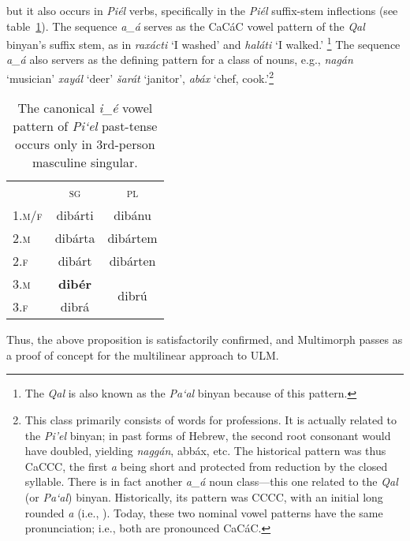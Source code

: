  but it also occurs in \textit{Pi\'{e}l} verbs, specifically in the \textit{Pi\'{e}l} suffix-stem inflections (see table~\ref{tab:piel-paradigm}).
The sequence \textit{a\_\'{a}} serves as the CaC\'{a}C vowel pattern of the \textit{Qal} 
binyan's suffix stem, as in \textit{rax\'{a}cti} `I washed' and \textit{hal\'{a}ti} `I walked.'
\footnote{The \textit{Qal} is also known as the \textit{\textit{Pa`al}} binyan because
of this pattern.}
The sequence \textit{a\_\'{a}} also servers as the defining pattern for a class of nouns, e.g., \textit{nag\'{an}} `musician'  \textit{xay\'{a}l} `deer' \textit{\v{s}ar\'{a}t} `janitor', \textit{ab\'{a}x} `chef, cook.'\footnote{This class primarily consists of words for professions. It is actually related to the \textit{Pi'el} binyan; in past forms of Hebrew, the second root consonant would have doubled, yielding \textit{nagg\'{an}}, abb\'{a}x, etc. The historical pattern was thus CaCCC, the first \textit{a} being short and protected from reduction by the closed syllable.   There is in fact another \textit{a\_\'{a}} noun class---this one related to the \textit{Qal} (or \textit{Pa`al}) binyan. Historically, its pattern was CCCC, with an initial long rounded \textit{a} (i.e., ). Today, these two nominal vowel patterns have the same pronunciation; i.e., both are pronounced CaC\'{a}C.}

\begin{table}[t]
\centering
\setlength{\extrarowheight}{6pt}
\begin{tabular}{lcc}
\toprule
& \textsc{sg} & \textsc{pl} \\
\cmidrule{2-3}
\textsc{1.m/f} & dib\'{a}rti &  dib\'{a}nu \\
\textsc{2.m} & dib\'{a}rta & dib\'{a}rtem \\
\textsc{2.f} & dib\'{a}rt & dib\'{a}rten \\
\textsc{3.m} & \textbf{dib\'{e}r} & \multirow{2}{*}{dibr\'{u}} \\
\textsc{3.f} &  dibr\'{a} &  \\
 \bottomrule
\end{tabular}
\label{tab:piel-paradigm}
\caption{The canonical \textit{i\_\'e} vowel pattern of \textit{Pi`el} past-tense occurs only in 3rd-person masculine singular.}
\end{table}

Thus, the above proposition is satisfactorily confirmed, and Multimorph passes as a proof of concept for the multilinear approach to ULM.

